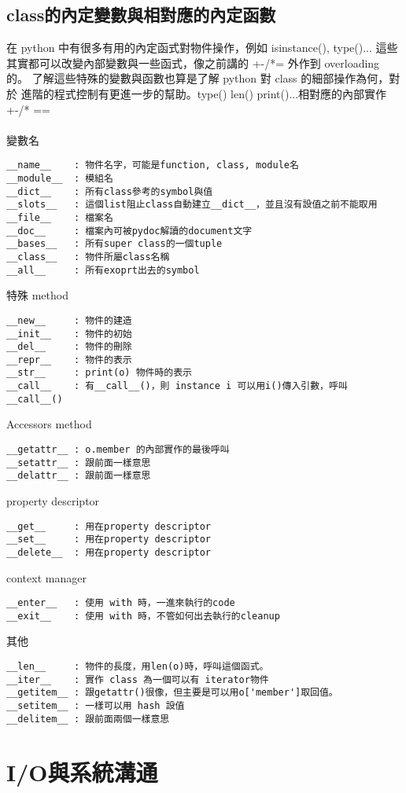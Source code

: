   \subsection{class的內定變數與相對應的內定函數}
  在 python 中有很多有用的內定函式對物件操作，例如 isinstance(), type()...
  這些其實都可以改變內部變數與一些函式，像之前講的 +-/*= 外作到 overloading 的。
  了解這些特殊的變數與函數也算是了解 python 對 class 的細部操作為何，對於
  進階的程式控制有更進一步的幫助。type() len() print()...相對應的內部實作
  +-/* ==
  \\\\
  變數名
\begin{verbatim}
__name__    : 物件名字，可能是function, class, module名
__module__  : 模組名
__dict__    : 所有class參考的symbol與值
__slots__   : 這個list阻止class自動建立__dict__，並且沒有設值之前不能取用
__file__    : 檔案名
__doc__     : 檔案內可被pydoc解讀的document文字
__bases__   : 所有super class的一個tuple
__class__   : 物件所屬class名稱
__all__     : 所有exoprt出去的symbol
\end{verbatim}
  特殊 method
\begin{verbatim}
__new__     : 物件的建造
__init__    : 物件的初始
__del__     : 物件的刪除
__repr__    : 物件的表示
__str__     : print(o) 物件時的表示
__call__    : 有__call__()，則 instance i 可以用i()傳入引數，呼叫__call__()
\end{verbatim}
  Accessors method
\begin{verbatim}
__getattr__ : o.member 的內部實作的最後呼叫
__setattr__ : 跟前面一樣意思
__delattr__ : 跟前面一樣意思
\end{verbatim}
  property descriptor
\begin{verbatim}
__get__     : 用在property descriptor
__set__     : 用在property descriptor
__delete__  : 用在property descriptor
\end{verbatim}
  context manager
\begin{verbatim}
__enter__   : 使用 with 時，一進來執行的code
__exit__    : 使用 with 時，不管如何出去執行的cleanup
\end{verbatim}
  其他
\begin{verbatim}
__len__     : 物件的長度，用len(o)時，呼叫這個函式。
__iter__    : 實作 class 為一個可以有 iterator物件
__getitem__ : 跟getattr()很像，但主要是可以用o['member']取回值。
__setitem__ : 一樣可以用 hash 設值
__delitem__ : 跟前面兩個一樣意思
\end{verbatim}

\section{I/O與系統溝通}
